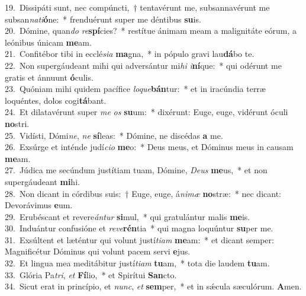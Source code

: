 {19.~}Dissipáti sunt, nec compúncti,~† tentavérunt me, subsannavérunt me subsan\textit{na}\textit{ti}\textbf{ó}ne:~* frenduérunt super me déntibus \textbf{su}is.\\
{20.~}Dómine, quan\textit{do} \textit{re}\textbf{spí}cies?~* restítue ánimam meam a malignitáte eórum, a leónibus únicam \textbf{me}am.\\
{21.~}Confitébor tibi in ecclé\textit{si}\textit{a} \textbf{ma}gna,~* in pópulo gravi lau\textbf{dá}bo te.\\
{22.~}Non supergáudeant mihi qui adversántur mi\textit{hi} \textit{i}\textbf{ní}que:~* qui odérunt me gratis et ánnuunt \textbf{ó}culis.\\
{23.~}Quóniam mihi quidem pacífice \textit{lo}\textit{que}\textbf{bán}tur:~* et in iracúndia terræ loquéntes, dolos cogi\textbf{tá}bant.\\
{24.~}Et dilatavérunt super \textit{me} \textit{os} \textbf{su}um:~* dixérunt: Euge, euge, vidérunt óculi \textbf{no}stri.\\
{25.~}Vidísti, Dómi\textit{ne}, \textit{ne} \textbf{sí}leas:~* Dómine, ne discédas \textbf{a} me.\\
{26.~}Exsúrge et inténde judí\textit{ci}\textit{o} \textbf{me}o:~* Deus meus, et Dóminus meus in causam \textbf{me}am.\\
{27.~}Júdica me secúndum justítiam tuam, Dómine, \textit{De}\textit{us} \textbf{me}us,~* et non supergáudeant \textbf{mi}hi.\\
{28.~}Non dicant in córdibus suis:~† Euge, euge, á\textit{ni}\textit{mæ} \textbf{no}stræ:~* nec dicant: Devorávimus \textbf{e}um.\\
{29.~}Erubéscant et revere\textit{án}\textit{tur} \textbf{si}mul,~* qui gratulántur malis \textbf{me}is.\\
{30.~}Induántur confusióne et \textit{re}\textit{ve}\textbf{rén}tia~* qui magna loquúntur \textbf{su}per me.\\
{31.~}Exsúltent et læténtur qui volunt justí\textit{ti}\textit{am} \textbf{me}am:~* et dicant semper: Magnificétur Dóminus qui volunt pacem servi \textbf{e}jus.\\
{32.~}Et lingua mea meditábitur justí\textit{ti}\textit{am} \textbf{tu}am,~* tota die laudem \textbf{tu}am.\\
{33.~}Glória Pa\textit{tri}, \textit{et} \textbf{Fí}lio,~* et Spirítui \textbf{San}cto.\\
{34.~}Sicut erat in princípio, et \textit{nunc}, \textit{et} \textbf{sem}per,~* et in sǽcula sæculórum. \textbf{A}men.\\
